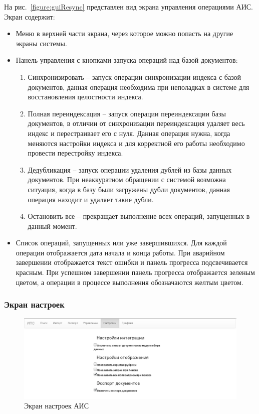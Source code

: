   На рис.~\ref{figure:guiResync} представлен вид экрана управления операциями АИС. Экран содержит:
  \begin{itemize}
  \item Меню в верхней части экрана, через которое можно попасть на другие экраны системы.
  \item Панель управления с кнопками запуска операций над базой документов: 
    \begin{enumerate}
      \item Синхронизировать -- запуск операции синхронизации индекса с базой документов, данная операция необходима при неполадках в системе для восстановления целостности индекса.
      \item Полная переиндексация -- запуск операции переиндексации базы документов, в отличии от синхронизации переиндексация удаляет весь индекс и перестраивает его с нуля. Данная операция нужна, когда меняются настройки индекса и для корректной его работы необходимо провести перестройку индекса.
      \item Дедубликация -- запуск операции удаления дублей из базы данных документов. При неаккуратном обращении с системой возможна ситуация, когда в базу были загружены дубли документов, данная операция находит и удаляет такие дубли.
      \item Остановить все -- прекращает выполнение всех операций, запущенных в данный момент.
    \end{enumerate}
  \item Список операций, запущенных или уже завершившихся. Для каждой операции отображается дата начала и конца работы. При аварийном завершении отображается текст ошибки и панель прогресса подсвечивается красным. При успешном завершении панель прогресса отображается зеленым цветом, а операции в процессе выполнения обозначаются желтым цветом.
  \end{itemize}

\clearpage
\subsubsection{Экран настроек}

\begin{figure}[h!]
\centering
\includegraphics[width=0.9\linewidth]{technology/gui_options}
\caption{Экран настроек АИС}
\label{figure:guiOptions}
\end{figure}

